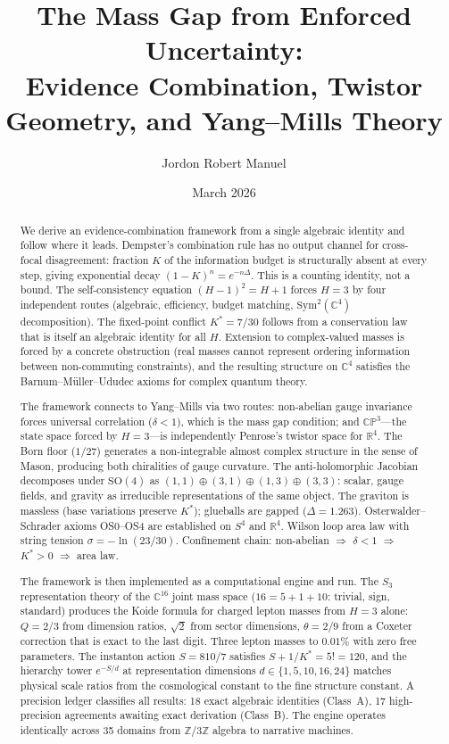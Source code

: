 \documentclass[11pt,a4paper]{article}
\title{The Mass Gap from Enforced Uncertainty:\\Evidence Combination, Twistor Geometry, and Yang--Mills Theory}
\author{Jordon Robert Manuel}
\date{March 2026}
\theoremstyle{definition}
\theoremstyle{remark}
\newcommand{\CP}{\mathbb{CP}}
\newcommand{\C}{\mathbb{C}}
\newcommand{\R}{\mathbb{R}}
\newcommand{\Z}{\mathbb{Z}}
\begin{document}
\maketitle

\begin{abstract}
We derive an evidence-combination framework from a single algebraic identity and follow where it leads. Dempster's combination rule has no output channel for cross-focal disagreement: fraction $K$ of the information budget is structurally absent at every step, giving exponential decay $(1-K)^n = e^{-n\Delta}$. This is a counting identity, not a bound. The self-consistency equation $(H-1)^2 = H+1$ forces $H=3$ by four independent routes (algebraic, efficiency, budget matching, $\mathrm{Sym}^2(\C^4)$ decomposition). The fixed-point conflict $K^* = 7/30$ follows from a conservation law that is itself an algebraic identity for all $H$. Extension to complex-valued masses is forced by a concrete obstruction (real masses cannot represent ordering information between non-commuting constraints), and the resulting structure on $\C^4$ satisfies the Barnum--M\"uller--Ududec axioms for complex quantum theory.

The framework connects to Yang--Mills via two routes: non-abelian gauge invariance forces universal correlation ($\delta < 1$), which is the mass gap condition; and $\CP^3$---the state space forced by $H=3$---is independently Penrose's twistor space for $\R^4$. The Born floor ($1/27$) generates a non-integrable almost complex structure in the sense of Mason, producing both chiralities of gauge curvature. The anti-holomorphic Jacobian decomposes under $\mathrm{SO}(4)$ as $(1,1)\oplus(3,1)\oplus(1,3)\oplus(3,3)$: scalar, gauge fields, and gravity as irreducible representations of the same object. The graviton is massless (base variations preserve $K^*$); glueballs are gapped ($\Delta = 1.263$). Osterwalder--Schrader axioms OS0--OS4 are established on $S^4$ and $\R^4$. Wilson loop area law with string tension $\sigma = -\ln(23/30)$. Confinement chain: non-abelian $\Rightarrow$ $\delta < 1$ $\Rightarrow$ $K^* > 0$ $\Rightarrow$ area law.

The framework is then implemented as a computational engine and run. The $S_3$ representation theory of the $\C^{16}$ joint mass space ($16 = 5 + 1 + 10$: trivial, sign, standard) produces the Koide formula for charged lepton masses from $H=3$ alone: $Q = 2/3$ from dimension ratios, $\sqrt{2}$ from sector dimensions, $\theta = 2/9$ from a Coxeter correction that is exact to the last digit. Three lepton masses to $0.01\%$ with zero free parameters. The instanton action $S = 810/7$ satisfies $S + 1/K^* = 5! = 120$, and the hierarchy tower $e^{-S/d}$ at representation dimensions $d \in \{1, 5, 10, 16, 24\}$ matches physical scale ratios from the cosmological constant to the fine structure constant. A precision ledger classifies all results: 18 exact algebraic identities (Class~A), 17 high-precision agreements awaiting exact derivation (Class~B). The engine operates identically across 35 domains from $\Z/3\Z$ algebra to narrative machines.


\end{abstract}
\end{document}

